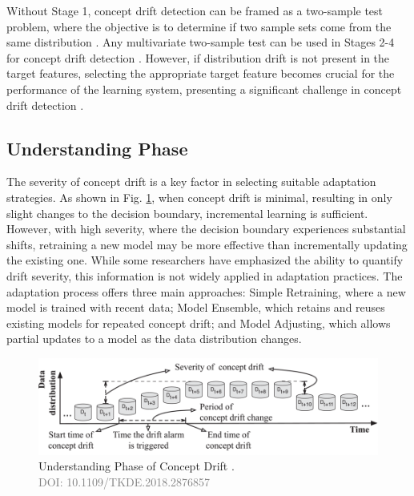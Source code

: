 Without Stage 1, concept drift detection can be framed as a two-sample test problem, where the objective is to determine if two sample sets come from the same distribution \cite{dries2009adaptive}. Any multivariate two-sample test can be used in Stages 2-4 for concept drift detection \cite{dries2009adaptive}. However, if distribution drift is not present in the target features, selecting the appropriate target feature becomes crucial for the performance of the learning system, presenting a significant challenge in concept drift detection \cite{yamada2013change}.

\subsection{Understanding Phase}
The severity of concept drift is a key factor in selecting suitable adaptation strategies. As shown in Fig. \ref{fig:concept-drift-understanding}, when concept drift is minimal, resulting in only slight changes to the decision boundary, incremental learning is sufficient. However, with high severity, where the decision boundary experiences substantial shifts, retraining a new model may be more effective than incrementally updating the existing one. While some researchers have emphasized the ability to quantify drift severity, this information is not widely applied in adaptation practices. The adaptation process offers three main approaches: Simple Retraining, where a new model is trained with recent data; Model Ensemble, which retains and reuses existing models for repeated concept drift; and Model Adjusting, which allows partial updates to a model as the data distribution changes.

\begin{figure}[!ht]
    \centering
    \includegraphics[width=.9\textwidth]{2_Background/figures/concept_drift_understanding.png}
    \caption{Understanding Phase of Concept Drift \cite{8496795}. \\ \textcolor{gray}{\fontsize{10}{0}\selectfont DOI: 10.1109/TKDE.2018.2876857}}
    \label{fig:concept-drift-understanding}
\end{figure}

